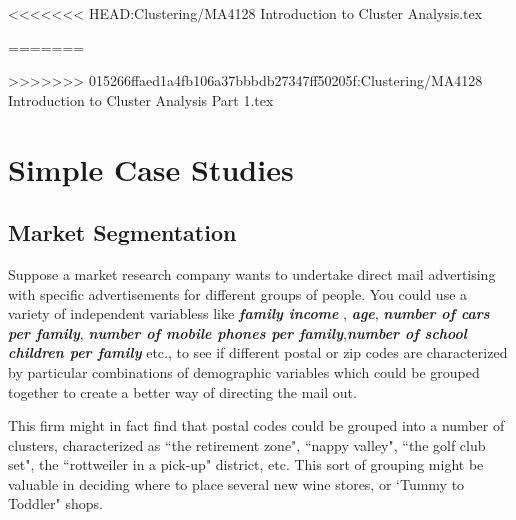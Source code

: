 <<<<<<< HEAD:Clustering/MA4128 Introduction to Cluster Analysis.tex

=======

%
%


>>>>>>> 015266ffaed1a4fb106a37bbbdb27347ff50205f:Clustering/MA4128 Introduction to Cluster Analysis Part 1.tex


\section{Simple Case Studies}
\subsection{Market Segmentation}
Suppose a market research company wants to undertake direct mail advertising with specific advertisements
for different groups of people. You could use a variety of independent variabless like \textbf{\textit{family income}}
, \textbf{\textit{age}}, \textbf{\textit{number of cars per family}}, \textbf{\textit{number of mobile phones per family}},\textbf{\textit{number of school children per family}}  etc., to see if different postal or zip codes are characterized by particular combinations of demographic variables which could be grouped together to create a better way of directing the mail out.

This firm might in fact find that postal codes could be grouped into a number of clusters, characterized as ``the retirement zone", ``nappy valley", ``the golf club set", the ``rottweiler in a pick-up" district, etc. This sort of grouping might  be valuable in deciding where to place several new wine stores, or `Tummy to Toddler" shops.

